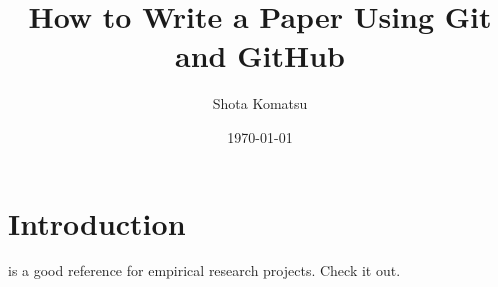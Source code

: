 \documentclass{article}
\title{How to Write a Paper Using Git and GitHub}
\author{Shota Komatsu}
\date{\today}
\begin{document}
\maketitle

\section{Introduction}

\citet{knittel2018working} is a good reference for empirical research projects. Check it out.



\end{document}

